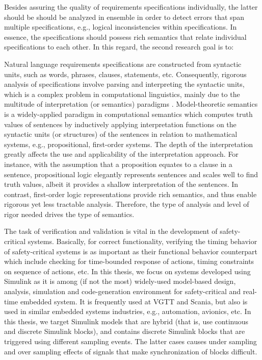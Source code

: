 Besides assuring the quality of requirements specifications individually, the latter should be should be analyzed in ensemble in order to detect errors that span multiple specifications, e.g., logical inconsistencies within specifications. In essence, the specifications should possess rich semantics that relate individual specifications to each other. In this regard, the second research goal is to:

\begin{researchgoal}
\end{researchgoal}

Natural language requirements specifications are constructed from syntactic units, such as words, phrases, clauses, statements, etc. Consequently, rigorous analysis of specifications involve parsing and interpreting the syntactic units, which is a complex problem in computational linguistics, mainly due to the multitude of  interpretation (or semantics) paradigms \cite{Clark2010TheProcessing}. Model-theoretic semantics is a widely-applied paradigm in computational semantics which computes truth values of sentences by inductively applying interpretation functions on the syntactic units (or structures) of the sentences in relation to mathematical systems, e.g., propositional, first-order systems. The depth of the interpretation greatly affects the use and applicability of the interpretation approach. For instance, with the assumption that a proposition equates to a clause in a sentence, propositional logic elegantly represents sentences and scales well to find truth values, albeit it provides a shallow interpretation of the sentences. In contrast, first-order logic representations provide rich semantics, and thus enable rigorous yet less tractable analysis. Therefore, the type of analysis and level of rigor needed drives the type of semantics.

The task of verification and validation is vital in the development of safety-critical systems. Basically, for correct functionality, verifying the timing behavior of safety-critical systems is as important as their functional behavior counterpart which include checking for time-bounded response of actions, timing constraints on sequence of actions, etc. In this thesis, we focus on systems developed using Simulink as it is among (if not the most) widely-used model-based design, analysis, simulation and code-generation environment for safety-critical and real-time embedded system. It is frequently used at VGTT and Scania, but also is used in similar embedded systems industries, e.g., automation, avionics, etc. In this thesis, we target Simulink models that are hybrid (that is, use continuous and discrete Simulink blocks), and contains discrete Simulink blocks that are triggered using different sampling events. The latter cases causes under sampling and over sampling effects of signals that make synchronization of blocks difficult.

